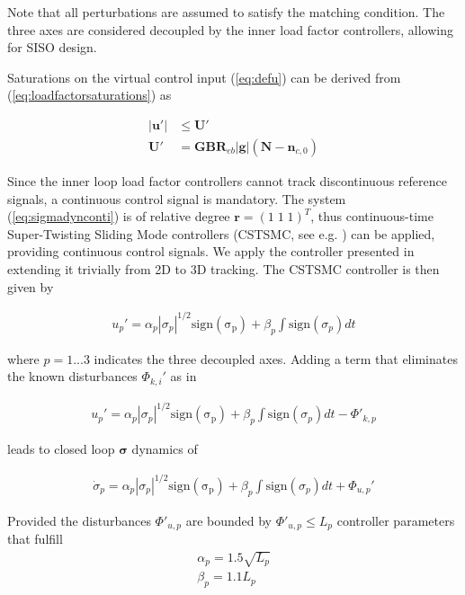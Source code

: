 \documentclass{ifacconf}
\providecommand{\mbf}[1]{\mathbf{#1}}
\newcommand{\idxAxis}{{\ensuremath{p}}}
\begin{document}
Note that all perturbations are assumed to satisfy the matching condition.
The three axes are considered decoupled by the inner load factor controllers, allowing for SISO design.

Saturations on the virtual control input (\ref{eq:defu}) can be derived from (\ref{eq:loadfactorsaturations}) as

\begin{align}
|\mbf{u}'| &\leq \mbf{U}' \\
\mbf{U}' &= \mbf{GB} \mbf{R}_{eb} |\mbf{g}|(\mbf{N}-\mbf{n}_{c,0})
\end{align}

Since the inner loop load factor controllers cannot track discontinuous reference signals, a continuous control signal is mandatory.
The system (\ref{eq:sigmadynconti}) is of relative degree $\mbf{r} = (1 \; 1 \; 1)^T$, thus continuous-time Super-Twisting Sliding Mode controllers (CSTSMC, see e.g. \cite{shtessel2014sliding}) can be applied, providing continuous control signals.
We apply the controller presented in \cite{galzi2006uav} extending it trivially from 2D to 3D tracking.
The CSTSMC controller is then given by

\begin{align}
u_\idxAxis' = \alpha_\idxAxis |\sigma_\idxAxis|^{1/2}\mathrm{sign(\sigma_\idxAxis)} + \beta_\idxAxis \int \mathrm{sign}(\sigma_\idxAxis) dt
\end{align}

where $\idxAxis = 1...3$ indicates the three decoupled axes. Adding a term that eliminates the known disturbances ${\Phi}_{k,i}'$ as in \cite{galzi2006uav}

\begin{align}
u_\idxAxis' = \alpha_\idxAxis |\sigma_\idxAxis|^{1/2}\mathrm{sign(\sigma_\idxAxis)} + \beta_\idxAxis \int \mathrm{sign}(\sigma_\idxAxis) dt - {\Phi}'_{k,\idxAxis}
\end{align}

leads to closed loop $\mbf{\sigma}$ dynamics of

\begin{align}
\dot{\sigma}_\idxAxis = \alpha_\idxAxis |\sigma_\idxAxis|^{1/2}\mathrm{sign(\sigma_\idxAxis)} + \beta_\idxAxis \int \mathrm{sign}(\sigma_\idxAxis) dt + \Phi_{u,\idxAxis}'
\end{align}

Provided the disturbances $\Phi'_{u,\idxAxis}$ are bounded by $\Phi'_{u,\idxAxis} \leq L_\idxAxis$ controller parameters that fulfill
\begin{align}
\alpha_\idxAxis = 1.5 \sqrt{L_\idxAxis}
\label{eq:csmcgainconditionalpha}\\
\beta_\idxAxis = 1.1 L_\idxAxis
\label{eq:csmcgainconditionbeta}
\end{align}
\end{document}
